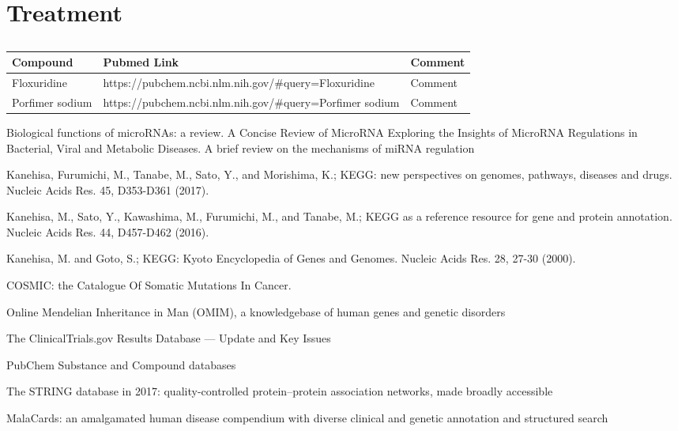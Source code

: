 \section{Treatment}

\begin{table}[H]\centering
 \caption {\cite{key470}\cite{key400}}
	\begin{tabular}{p{1cm}p{4cm}p{3cm}}
	Compound & Pubmed Link & Comment\\
		\hline
	Floxuridine & https://pubchem.ncbi.nlm.nih.gov/#query=Floxuridine & Comment\\
	Porfimer sodium & https://pubchem.ncbi.nlm.nih.gov/#query=Porfimer sodium & Comment\\
	\hline
	\end{tabular}
\end{table}



 Biological functions of microRNAs: a review.
 A Concise Review of MicroRNA Exploring the Insights of MicroRNA Regulations in Bacterial, Viral and Metabolic Diseases.
 A brief review on the mechanisms of miRNA regulation



 Kanehisa, Furumichi, M., Tanabe, M., Sato, Y., and Morishima, K.; 
\newblock KEGG: new perspectives on genomes, pathways, diseases and drugs. 
\newblock Nucleic Acids Res. 45, D353-D361 (2017).

 Kanehisa, M., Sato, Y., Kawashima, M., Furumichi, M., and Tanabe, M.; 
\newblock KEGG as a reference resource for gene and protein annotation. 
\newblock Nucleic Acids Res. 44, D457-D462 (2016).

 Kanehisa, M. and Goto, S.; 
\newblock KEGG: Kyoto Encyclopedia of Genes and Genomes. 
\newblock Nucleic Acids Res. 28, 27-30 (2000). 

 COSMIC: the Catalogue Of Somatic Mutations In Cancer.

 Online Mendelian Inheritance in Man (OMIM), a knowledgebase of human genes and genetic disorders

 The ClinicalTrials.gov Results Database — Update and Key Issues

 PubChem Substance and Compound databases

 The STRING database in 2017: quality-controlled protein–protein association networks, made broadly accessible

 MalaCards: an amalgamated human disease compendium with diverse clinical and genetic annotation and structured search


